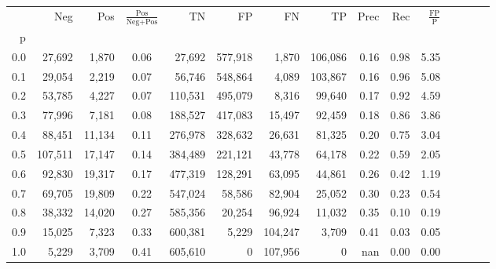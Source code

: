\begin{tabular}{rrrcrrrrrrrrrrr}
\toprule
{} &      Neg &     Pos & $\frac{\text{Pos}}{\text{Neg}+\text{Pos}}$ &       TN &       FP &       FN &       TP &  Prec &   Rec & $\frac{\text{FP}}{\text{P}}$ \\
p   &          &         &                                            &          &          &          &          &       &       &                              \\
\midrule
0.0 &   27,692 &   1,870 &                                       0.06 &   27,692 &  577,918 &    1,870 &  106,086 &  0.16 &  0.98 &                         5.35 \\
0.1 &   29,054 &   2,219 &                                       0.07 &   56,746 &  548,864 &    4,089 &  103,867 &  0.16 &  0.96 &                         5.08 \\
0.2 &   53,785 &   4,227 &                                       0.07 &  110,531 &  495,079 &    8,316 &   99,640 &  0.17 &  0.92 &                         4.59 \\
0.3 &   77,996 &   7,181 &                                       0.08 &  188,527 &  417,083 &   15,497 &   92,459 &  0.18 &  0.86 &                         3.86 \\
0.4 &   88,451 &  11,134 &                                       0.11 &  276,978 &  328,632 &   26,631 &   81,325 &  0.20 &  0.75 &                         3.04 \\
0.5 &  107,511 &  17,147 &                                       0.14 &  384,489 &  221,121 &   43,778 &   64,178 &  0.22 &  0.59 &                         2.05 \\
0.6 &   92,830 &  19,317 &                                       0.17 &  477,319 &  128,291 &   63,095 &   44,861 &  0.26 &  0.42 &                         1.19 \\
0.7 &   69,705 &  19,809 &                                       0.22 &  547,024 &   58,586 &   82,904 &   25,052 &  0.30 &  0.23 &                         0.54 \\
0.8 &   38,332 &  14,020 &                                       0.27 &  585,356 &   20,254 &   96,924 &   11,032 &  0.35 &  0.10 &                         0.19 \\
0.9 &   15,025 &   7,323 &                                       0.33 &  600,381 &    5,229 &  104,247 &    3,709 &  0.41 &  0.03 &                         0.05 \\
1.0 &    5,229 &   3,709 &                                       0.41 &  605,610 &        0 &  107,956 &        0 &   nan &  0.00 &                         0.00 \\
\bottomrule
\end{tabular}
